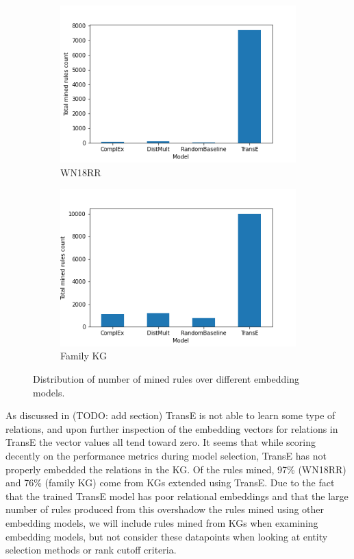 \begin{figure}[h]
\centering
\begin{subfigure}{.5\textwidth}
  \centering
  \includegraphics[width=1\linewidth]{figures/results/Total_mined_rules-model-wn18rr.png}
  \caption{WN18RR}
  \label{fig:sub1}
\end{subfigure}%
\begin{subfigure}{.5\textwidth}
  \centering
  \includegraphics[width=1\linewidth]{figures/results/Total_mined_rules-model-family.png}
  \caption{Family KG}
  \label{fig:sub2}
\end{subfigure}
\caption{Distribution of number of mined rules over different embedding models.}
\label{fig:test}
\end{figure}

As discussed in (TODO: add section) TransE is not able to learn some type of relations, and upon further inspection of the embedding vectors for relations in TransE the vector values all tend toward zero. It seems that while scoring decently on the performance metrics during model selection, TransE has not properly embedded the relations in the KG. Of the rules mined, 97\% (WN18RR) and 76\% (family KG) come from KGs extended using TransE. Due to the fact that the trained TransE model has poor relational embeddings and that the large number of rules produced from this overshadow the rules mined using other embedding models, we will include  rules mined from KGs when examining embedding models, but not consider these datapoints when looking at entity selection methods or rank cutoff criteria.

